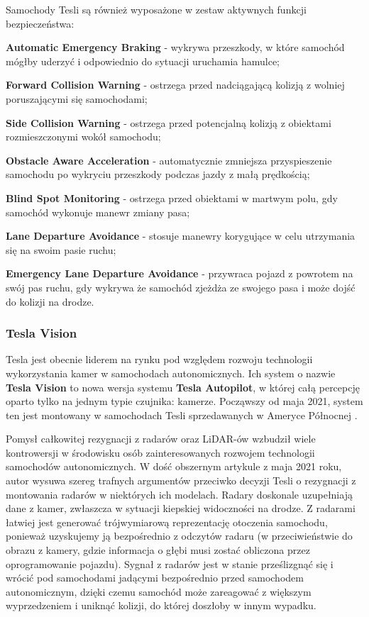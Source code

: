Samochody Tesli są również wyposażone w zestaw aktywnych funkcji bezpieczeństwa:
\vspace{-0.25cm}
\begin{enumerate*}
\item \textbf{Automatic Emergency Braking} - wykrywa przeszkody, w które samochód mógłby uderzyć i odpowiednio do sytuacji uruchamia hamulce;
\item \textbf{Forward Collision Warning} - ostrzega przed nadciągającą kolizją z wolniej poruszającymi się samochodami;
\item \textbf{Side Collision Warning} - ostrzega przed potencjalną kolizją z obiektami rozmieszczonymi wokół samochodu;
\item \textbf{Obstacle Aware Acceleration} - automatycznie zmniejsza przyspieszenie samochodu po wykryciu przeszkody podczas jazdy z małą prędkością;
\item \textbf{Blind Spot Monitoring} - ostrzega przed obiektami w martwym polu, gdy samochód wykonuje manewr zmiany pasa;
\item \textbf{Lane Departure Avoidance} - stosuje manewry korygujące w celu utrzymania się na swoim pasie ruchu;
\item \textbf{Emergency Lane Departure Avoidance} - przywraca pojazd z powrotem na swój pas ruchu, gdy wykrywa że samochód zjeżdża ze swojego pasa i może dojść do kolizji na drodze.
\end{enumerate*}

\subsubsection{Tesla Vision}
Tesla jest obecnie liderem na rynku pod względem rozwoju technologii wykorzystania kamer w samochodach autonomicznych. Ich system o nazwie 
\textbf{Tesla Vision} to nowa wersja systemu \textbf{Tesla Autopilot}, w której całą percepcję oparto tylko na jednym typie czujnika: kamerze. Począwszy od maja 2021, system ten jest montowany w samochodach Tesli sprzedawanych w Ameryce Północnej \cite{tesla:transToVision}.

Pomysł całkowitej rezygnacji z radarów oraz LiDAR-ów wzbudził wiele kontrowersji w środowisku osób zainteresowanych rozwojem technologii samochodów autonomicznych. W dość obszernym artykule \cite{torchinsky:teslaRemoveRadar} z maja 2021 roku, autor wysuwa szereg trafnych argumentów przeciwko decyzji Tesli o rezygnacji z montowania radarów w niektórych ich modelach. Radary doskonale uzupełniają dane z kamer, zwłaszcza w sytuacji kiepskiej widoczności na drodze. Z radarami łatwiej jest generować trójwymiarową reprezentację otoczenia samochodu, ponieważ uzyskujemy ją bezpośrednio z odczytów radaru (w przeciwieństwie do obrazu z kamery, gdzie informacja o głębi musi zostać obliczona przez oprogramowanie pojazdu). Sygnał z radarów jest w stanie prześlizgnąć się i wrócić pod samochodami jadącymi bezpośrednio przed samochodem autonomicznym, dzięki czemu samochód może zareagować z większym wyprzedzeniem i uniknąć kolizji, do której doszłoby w innym wypadku.

